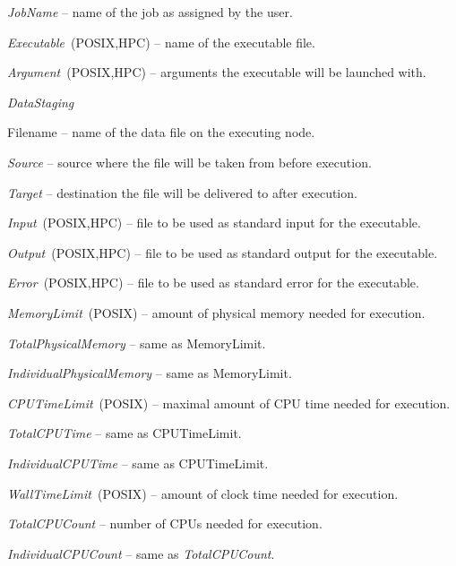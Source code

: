 \documentclass{article}                            %
\begin{document}
\begin{list}{--}{\setlength{\labelwidth}{0.5cm}\setlength{\rightmargin}{\leftmargin}}
\item [{\emph{JobName}}] -- name of the job as assigned by the user.
\item [{\emph{Executable}\ (POSIX,HPC)}] -- name of the executable file.
\item [{\emph{Argument}\ (POSIX,HPC)}] -- arguments the executable will
be launched with.
\item [{\emph{DataStaging}}]~
\begin{list}{--}{\setlength{\labelwidth}{0.5cm}\setlength{\rightmargin}{\leftmargin}}
\item [{Filename}] -- name of the data file on the executing node.
\item [{\emph{Source}}] -- source where the file will be taken from before
execution.
\item [{\emph{Target}}] -- destination the file will be delivered
to after execution.
\end{list}
\item [{\emph{Input}\ (POSIX,HPC)}] -- file to be used as standard input
for the executable.
\item [{\emph{Output}\ (POSIX,HPC)}] -- file to be used as standard output
for the executable.
\item [{\emph{Error}\ (POSIX,HPC)}] -- file to be used as standard error
for the executable.
\item [{\emph{MemoryLimit}\ (POSIX)}] -- amount of physical memory needed
for execution.
\item [{\emph{TotalPhysicalMemory}}] -- same as MemoryLimit.
\item [{\emph{IndividualPhysicalMemory}}] -- same as MemoryLimit.
\item [{\emph{CPUTimeLimit}\ (POSIX)}] -- maximal amount of CPU time needed
for execution.
\item [{\emph{TotalCPUTime}}] -- same as CPUTimeLimit.
\item [{\emph{IndividualCPUTime}}] -- same as CPUTimeLimit.
\item [{\emph{WallTimeLimit}\ (POSIX)}] -- amount of clock time needed
for execution.
\item [{\emph{TotalCPUCount}}] -- number of CPUs needed for execution.
\item [{\emph{IndividualCPUCount}}] -- same as \emph{TotalCPUCount}.
\end{list}
\end{document}
